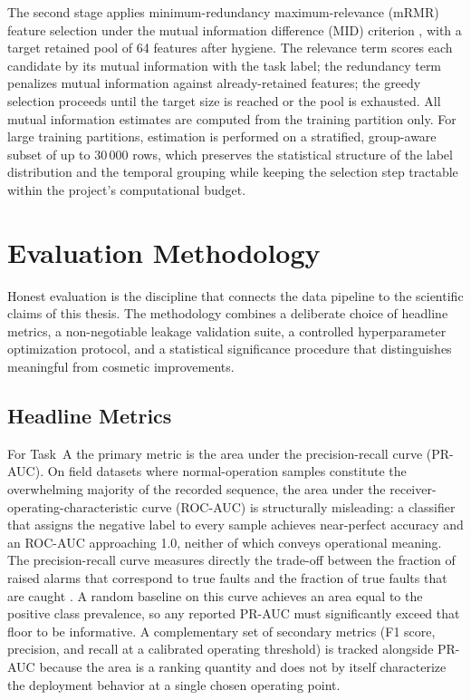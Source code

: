 The second stage applies minimum-redundancy maximum-relevance (mRMR) feature selection under the mutual information difference (MID) criterion \citep{peng2005mrmr}, with a target retained pool of 64 features after hygiene. The relevance term scores each candidate by its mutual information with the task label; the redundancy term penalizes mutual information against already-retained features; the greedy selection proceeds until the target size is reached or the pool is exhausted. All mutual information estimates are computed from the training partition only. For large training partitions, estimation is performed on a stratified, group-aware subset of up to 30\,000 rows, which preserves the statistical structure of the label distribution and the temporal grouping while keeping the selection step tractable within the project's computational budget.

\section{Evaluation Methodology}
\label{sec:evaluation-methodology}

Honest evaluation is the discipline that connects the data pipeline to the scientific claims of this thesis. The methodology combines a deliberate choice of headline metrics, a non-negotiable leakage validation suite, a controlled hyperparameter optimization protocol, and a statistical significance procedure that distinguishes meaningful from cosmetic improvements.

\subsection{Headline Metrics}

For Task~A the primary metric is the area under the precision-recall curve (PR-AUC). On field datasets where normal-operation samples constitute the overwhelming majority of the recorded sequence, the area under the receiver-operating-characteristic curve (ROC-AUC) is structurally misleading: a classifier that assigns the negative label to every sample achieves near-perfect accuracy and an ROC-AUC approaching 1.0, neither of which conveys operational meaning. The precision-recall curve measures directly the trade-off between the fraction of raised alarms that correspond to true faults and the fraction of true faults that are caught \citep{saito2015pr}. A random baseline on this curve achieves an area equal to the positive class prevalence, so any reported PR-AUC must significantly exceed that floor to be informative. A complementary set of secondary metrics (F1 score, precision, and recall at a calibrated operating threshold) is tracked alongside PR-AUC because the area is a ranking quantity and does not by itself characterize the deployment behavior at a single chosen operating point.

